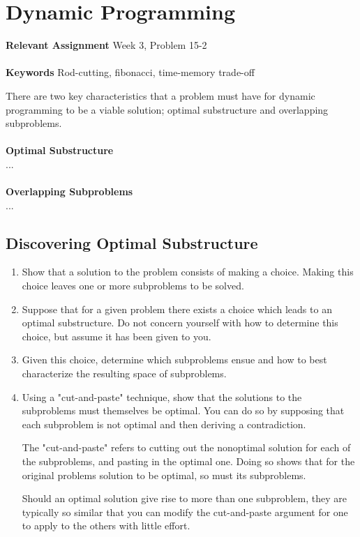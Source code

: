 
\chapter{Dynamic Programming}
\label{ch:dynamicprog}

\textbf{Relevant Assignment} Week 3, Problem 15-2\\\\
\textbf{Keywords} Rod-cutting, fibonacci, time-memory trade-off
\vspace{1in}

\noindent There are two key characteristics that a problem must have for
dynamic programming to be a viable solution; optimal substructure and
overlapping subproblems.
\\\\
\noindent \textbf{Optimal Substructure}\\
... %
\\\\
\noindent \textbf{Overlapping Subproblems}\\
... %

\newpage
\section{Discovering Optimal Substructure}
\begin{enumerate}
	\item Show that a solution to the problem consists of making a choice.
Making this choice leaves one or more subproblems to be solved.
	\item Suppose that for a given problem there exists a choice which leads
to an optimal substructure. Do not concern yourself with how to determine this
choice, but assume it has been given to you.
	\item Given this choice, determine which subproblems ensue and how to best
characterize the resulting space of subproblems.
	\item Using a "cut-and-paste" technique, show that the solutions to the
subproblems must themselves be optimal. You can do so by supposing that each
subproblem is not optimal and then deriving a contradiction.

The "cut-and-paste" refers to cutting out the nonoptimal solution for each of
the subproblems, and pasting in the optimal one. Doing so shows that for the
original problems solution to be optimal, so must its subproblems.

Should an optimal solution give rise to more than one subproblem, they are
typically so similar that you can modify the cut-and-paste argument for one to
apply to the others with little effort.
\end{enumerate}

